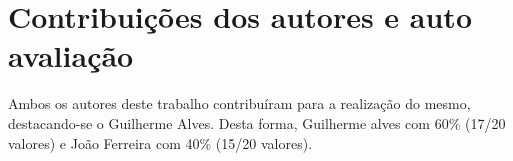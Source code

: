 \documentclass{report}
\begin{document}
\chapter*{Contribuições dos autores e auto avaliação}
Ambos os autores deste trabalho contribuíram para a realização do mesmo, destacando-se o Guilherme Alves. Desta forma, Guilherme alves com 60\% (17/20 valores) e João Ferreira com 40\% (15/20 valores).

\printbibliography
\end{document}
